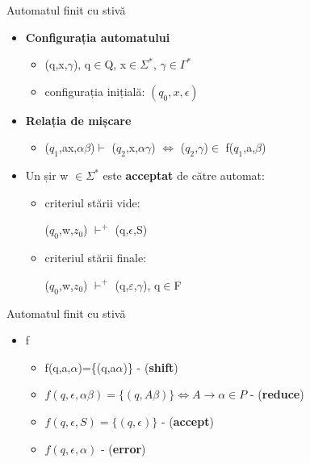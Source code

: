 \documentclass[pdf]{beamer}
\begin{document}
\begin{frame}{Automatul finit cu stivă}
\begin{itemize}

\item
\textbf{Configurația automatului}

\begin{itemize}
\item
(q,x,$\gamma$), q$\in$Q, x$\in\Sigma^{*}$, $\gamma\in\Gamma^{*}$

\item
configurația inițială: $(q_0,x,\epsilon)$
\end{itemize}

\item
\textbf{Relația de mișcare}

\begin{itemize}
\item
($q_{1}$,ax,$\alpha \beta$)$\vdash$ ($q_{2}$,x,$\alpha\gamma$) $\Leftrightarrow$ ($q_{2}$,$\gamma$)$\in$ f($q_{1}$,a,$\beta$)
\end{itemize}

\item
Un șir w $\in\Sigma^{*}$ este \textbf{acceptat} de către automat:

\begin{itemize}
\item
criteriul stării vide:

 ($q_{0}$,w,$z_{0}$) $\vdash^+$ (q,$\epsilon$,S)

\item
criteriul stării finale:

($q_{0}$,w,$z_{0}$) $\vdash^+$ (q,$\varepsilon$,$\gamma$), q$\in$F
\end{itemize}

\end{itemize}
\end{frame}



\begin{frame}{Automatul finit cu stivă}

\begin{itemize}
\item
f

\begin{itemize}
\item
f(q,a,$\alpha$)=\{(q,a$\alpha$)\} - (\textbf{shift})

\item
$f(q,\epsilon , \alpha \beta)=\{(q,A \beta)\} \Leftrightarrow A \to \alpha \in P$ - (\textbf{reduce})

\item
$f(q,\epsilon ,S)=\{(q,\epsilon)\}$ - (\textbf{accept})

\item
$f(q,\epsilon ,\alpha)$ - (\textbf{error})
\end{itemize}
\end{itemize}
\end{frame}
\end{document}
